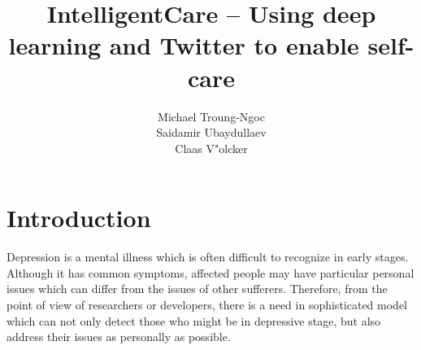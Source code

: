 \documentclass[colorback,accentcolor=tud9c]{tudreport}
\title{IntelligentCare -- Using deep learning and Twitter to enable self-care}
\subtitle{Michael Troung-Ngoc\\Saidamir Ubaydullaev\\Claas V"olcker}
\begin{document}
\maketitle


\section*{Introduction}

Depression is a mental illness which is often difficult to recognize in early stages. Although it has common symptoms, affected people may have particular personal issues which can differ from the issues of other sufferers. Therefore, from the point of view of researchers or developers, there is a need in sophisticated model which can not only detect those who might be in depressive stage, but also address their issues as personally as possible.
\end{document}
